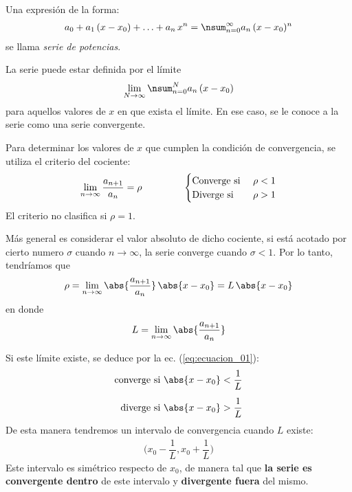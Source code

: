 Una expresión de la forma:
\begin{align}
a_{0} + a_{1} \, (x - x_{0}) + \ldots + a_{n} \, x^{n} = \nsum_{n=0}^{\infty} a_{n} \, (x - x_{0})^{n}
\label{eq:ecuacion_01}    
\end{align}
se llama \textit{serie de potencias}.
\par
La serie puede estar definida por el límite
\begin{align*}
\lim_{N \to \infty} \nsum_{n=0}^{N} a_{n} \, (x - x_{0})
\end{align*}
para aquellos valores de $x$ en que exista el límite. En ese caso, se le conoce a la serie como una serie convergente.
\par
Para determinar los valores de $x$ que cumplen la condición de convergencia, se utiliza el criterio del cociente:
\begin{align*}
\lim_{n \to \infty} \dfrac{a_{n+1}}{a_{n}} = \rho \hspace{1.5cm} \begin{cases}
\text{Converge si } & \rho < 1 \\
\text{Diverge si } & \rho > 1
\end{cases}
\end{align*}
El criterio no clasifica si $\rho = 1$.
\par
Más general es considerar el valor absoluto de dicho cociente, si está acotado por cierto numero $\sigma$ cuando $n \to \infty$, la serie converge cuando $\sigma < 1$. Por lo tanto, tendríamos que
\begin{align*}
\rho = \lim_{n \to \infty} \abs{\dfrac{a_{n+1}}{a_{n}}} \, \abs{x - x_{0}} = L \, \abs{x - x_{0}}
\end{align*}
en donde
\begin{align*}
L = \lim_{n \to \infty} \abs{\dfrac{a_{n+1}}{a_{n}}}
\end{align*}
\par
Si este límite existe, se deduce por la ec. (\ref{eq:ecuacion_01}):
\begin{align}
\begin{aligned}        
\text{converge si } &\abs{x - x_{0}} < \dfrac{1}{L} \\[0.5em]
\text{diverge si } &\abs{x - x_{0}} > \dfrac{1}{L}
\end{aligned}
\label{eq:ecuacion_02}    
\end{align}
De esta manera tendremos un intervalo de convergencia cuando $L$ existe:
\begin{align*}
\bigg( x_{0} - \dfrac{1}{L}, x_{0} + \dfrac{1}{L} \bigg)
\end{align*}
Este intervalo es simétrico respecto de $x_{0}$, de manera tal que \textbf{la serie es convergente dentro} de este intervalo y \textbf{divergente fuera} del mismo.

